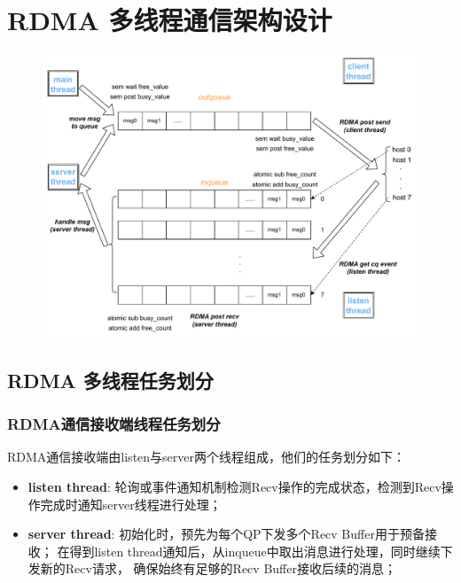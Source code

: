 {    \section{RDMA 多线程通信架构设计}\label{sec:RDMA 多线程通信架构设计}

    \begin{figure}[H]
        \centering
        \includegraphics[width=1.1\textwidth]{Img/RDMA_design.drawio.pdf}
    \end{figure}


    \subsection{RDMA 多线程任务划分}

    \subsubsection{RDMA通信接收端线程任务划分}
    RDMA通信接收端由listen与server两个线程组成，他们的任务划分如下：

    \begin{itemize}[leftmargin=*, nosep]
        \item \textbf{listen thread}:
              轮询或事件通知机制检测Recv操作的完成状态，检测到Recv操作完成时通知server线程进行处理；
        \item \textbf{server thread}:
              初始化时，预先为每个QP下发多个Recv Buffer用于预备接收；
              在得到listen thread通知后，从inqueue中取出消息进行处理，同时继续下发新的Recv请求，
              确保始终有足够的Recv Buffer接收后续的消息；
    \end{itemize}

}
